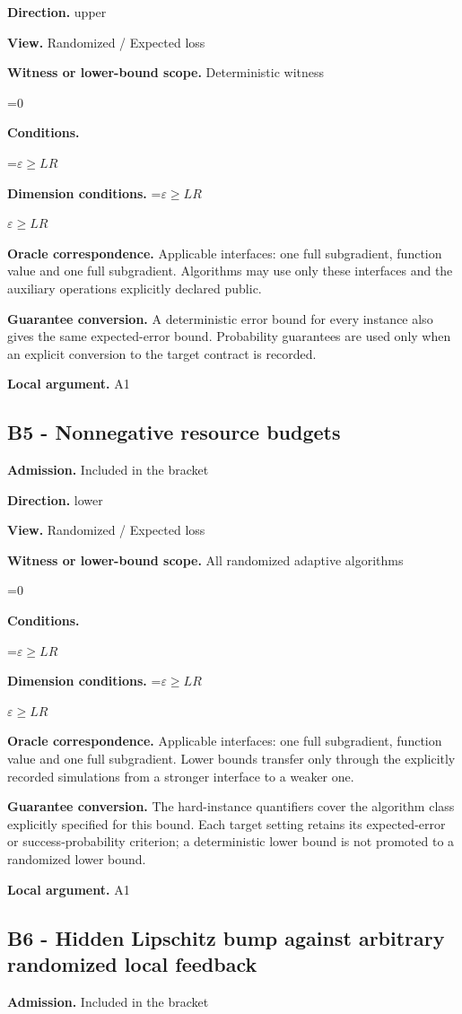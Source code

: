 \documentclass[10pt,a4paper]{article}
\newcommand{\AtlasMath}[1]{\par\begingroup\centering\setbox0=\hbox{$\displaystyle #1$}\ifdim\wd0>1.4\linewidth\typeout{ATLAS WIDE FORMULA: \the\wd0}\fi\ifdim\wd0>\linewidth\resizebox{\linewidth}{!}{\box0}\else\box0\fi\par\endgroup}
\newcommand{\AtlasInlineMath}[1]{\begingroup\setbox0=\hbox{$#1$}\ifdim\wd0>.4\linewidth\endgroup\AtlasMath{#1}\else\endgroup$#1$\fi}
\begin{document}
\textbf{Direction.} upper

\textbf{View.} Randomized / Expected loss

\textbf{Witness or lower-bound scope.} Deterministic witness

\AtlasMath{0}
\textbf{Conditions.} 
\AtlasMath{\varepsilon\ge LR}


\textbf{Dimension conditions.} \AtlasInlineMath{\varepsilon\ge LR}

\textbf{Oracle correspondence.} Applicable interfaces: one full subgradient, function value and one full subgradient. Algorithms may use only these interfaces and the auxiliary operations explicitly declared public.

\textbf{Guarantee conversion.} A deterministic error bound for every instance also gives the same expected-error bound. Probability guarantees are used only when an explicit conversion to the target contract is recorded.

\textbf{Local argument.} A1

\subsection{B5 - Nonnegative resource budgets}
\textbf{Admission.} Included in the bracket

\textbf{Direction.} lower

\textbf{View.} Randomized / Expected loss

\textbf{Witness or lower-bound scope.} All randomized adaptive algorithms

\AtlasMath{0}
\textbf{Conditions.} 
\AtlasMath{\varepsilon\ge LR}


\textbf{Dimension conditions.} \AtlasInlineMath{\varepsilon\ge LR}

\textbf{Oracle correspondence.} Applicable interfaces: one full subgradient, function value and one full subgradient. Lower bounds transfer only through the explicitly recorded simulations from a stronger interface to a weaker one.

\textbf{Guarantee conversion.} The hard-instance quantifiers cover the algorithm class explicitly specified for this bound. Each target setting retains its expected-error or success-probability criterion; a deterministic lower bound is not promoted to a randomized lower bound.

\textbf{Local argument.} A1

\subsection{B6 - Hidden Lipschitz bump against arbitrary randomized local feedback}
\textbf{Admission.} Included in the bracket
\end{document}

